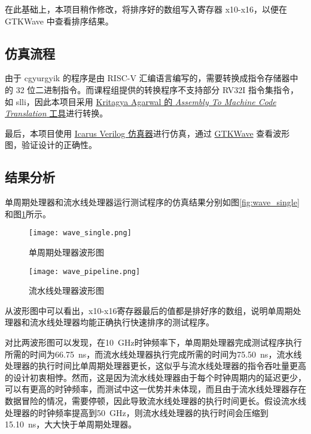 \documentclass[lang=zh]{sjtuarticle}	%
\begin{document}
在此基础上，本项目稍作修改，将排序好的数组写入寄存器 x10-x16，以便在 GTKWave 中查看排序结果。

\subsection{仿真流程}

由于 cgyurgyik 的程序是由 RISC-V 汇编语言编写的，需要转换成指令存储器中的 32 位二进制指令。而课程组提供的转换程序不支持部分 RV32I 指令集指令，如 slli，因此本项目采用 \href{https://github.com/Kritagya-Agarwal/Assembly-To-Machine-Code-RISC-V}{Kritagya Agarwal 的 \textit{Assembly To Machine Code Translation} 工具}进行转换。

最后，本项目使用 \href{https://github.com/steveicarus/iverilog}{Icarus Verilog 仿真器}进行仿真，通过 \href{https://github.com/gtkwave/gtkwave}{GTKWave} 查看波形图，验证设计的正确性。

\subsection{结果分析}

单周期处理器和流水线处理器运行测试程序的仿真结果分别如图\ref{fig:wave_single}和图\ref{fig:wave_pipeline}所示。

\begin{figure}[!htp]
	\centering
	\begin{minipage}{\textwidth}
		\centering
		\texttt{[image: wave\_single.png]}
		\caption{单周期处理器波形图}
		\label{fig:wave_single}
	\end{minipage}
	\begin{minipage}{\textwidth}
		\centering
		\texttt{[image: wave\_pipeline.png]}
		\caption{流水线处理器波形图}
		\label{fig:wave_pipeline}
	\end{minipage}
\end{figure}

从波形图中可以看出，x10-x16寄存器最后的值都是排好序的数组，说明单周期处理器和流水线处理器均能正确执行快速排序的测试程序。

对比两波形图可以发现，在\SI{10}{\GHz}时钟频率下，单周期处理器完成测试程序执行所需的时间为\SI{66.75}{\ns}，而流水线处理器执行完成所需的时间为\SI{75.50}{\ns}，流水线处理器的执行时间比单周期处理器更长，这似乎与流水线处理器的指令吞吐量更高的设计初衷相悖。然而，这是因为流水线处理器由于每个时钟周期内的延迟更少，可以有更高的时钟频率，而测试中这一优势并未体现，而且由于流水线处理器存在数据冒险的情况，需要停顿，因此导致流水线处理器的执行时间更长。假设流水线处理器的时钟频率提高到\SI{50}{\GHz}，则流水线处理器的执行时间会压缩到\SI{15.10}{\ns}，大大快于单周期处理器。

\nocite{*}
\printbibliography
\end{document}
